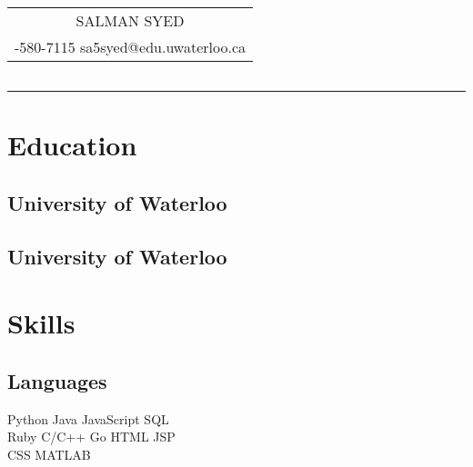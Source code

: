 \documentclass[letterpaper]{deedy-resume}
\begin{document}
\sffamily

\hfill
{\Huge\bfseries\begin{tabular}[c]{c}
\vspace*{-0.6cm}
SALMAN SYED\\
\fontsize{9}{0}
\selectfont
519-580-7115  \textbullet{} sa5syed@edu.uwaterloo.ca
\end{tabular}}\hfill
{\small\bfseries\begin{tabular}[c]{c}

\end{tabular}}\hfill

\noindent\rule{7.5in}{0.4pt}

\begin{minipage}[t]{0.33\textwidth}

\section{Education} 

\subsection{University of Waterloo}


\sectionspace

\subsection{University of Waterloo}


\sectionspace

\section{Skills}

\subsection{Languages}

Python \textbullet{} Java \textbullet{} JavaScript \textbullet{} SQL \\
Ruby \textbullet{}  C/C++ \textbullet{} Go \textbullet{} HTML \textbullet{} JSP \\
CSS \textbullet{} MATLAB \\


\end{minipage}
\end{document}
